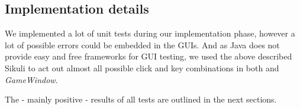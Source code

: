 \subsection{Implementation details}
We implemented a lot of unit tests during our implementation phase, however a lot of possible errors could be embedded in the GUIs. And as Java does not provide easy and free frameworks for GUI testing, we used the above described Sikuli to act out almost all possible click and key combinations in both \gameexplorer and \emph{GameWindow}.\par
The - mainly positive - results of all tests are outlined in the next sections.\par
